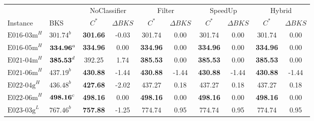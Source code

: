 \begin{table}[ht]
	\centering
	\scriptsize
	\renewcommand{\arraystretch}{1.02}
	\begin{tabular}{@{}llcccccccc@{}}
		\toprule
		                    &                             & \multicolumn{2}{c}{NoClassifier} & \multicolumn{2}{c}{Filter} & \multicolumn{2}{c}{SpeedUp} & \multicolumn{2}{c}{Hybrid}                                                                    \\ \cmidrule(lr){3-4}\cmidrule(lr){5-6}\cmidrule(lr){7-8}\cmidrule(lr){9-10}
		Instance            & BKS                         & $C^*$                            & $\Delta BKS$               & $C^*$                       & $\Delta BKS$               & $C^*$            & $\Delta BKS$ & $C^*$           & $\Delta BKS$ \\
		\midrule
		$\text{E016-03m}^H$ & $\text{301.74}^b$           & \textbf{301.66}                  & -0.03                      & 301.74                      & 0.00                       & 301.74           & 0.00         & 301.74          & 0.00         \\
		$\text{E016-05m}^H$ & $\text{\textbf{334.96}}^a$  & \textbf{334.96}                  & 0.00                       & \textbf{334.96}             & 0.00                       & \textbf{334.96}  & 0.00         & \textbf{334.96} & 0.00         \\
		$\text{E021-04m}^H$ & $\text{\textbf{385.53}}^d$  & 392.25                           & 1.74                       & \textbf{385.53}             & 0.00                       & \textbf{385.53}  & 0.00         & \textbf{385.53} & 0.00         \\
		$\text{E021-06m}^H$ & $\text{437.19}^b$           & \textbf{430.88}                  & -1.44                      & \textbf{430.88}             & -1.44                      & \textbf{430.88}  & -1.44        & \textbf{430.88} & -1.44        \\
		$\text{E022-04g}^H$ & $\text{436.48}^b$           & \textbf{427.68}                  & -2.02                      & 437.27                      & 0.18                       & 437.27           & 0.18         & 437.27          & 0.18         \\
		$\text{E022-06m}^H$ & $\text{\textbf{498.16}}^c$  & \textbf{498.16}                  & 0.00                       & \textbf{498.16}             & 0.00                       & \textbf{498.16}  & 0.00         & \textbf{498.16} & 0.00         \\
		$\text{E023-03g}^L$ & $\text{767.46}^b$           & \textbf{757.88}                  & -1.25                      & 774.74                      & 0.95                       & 774.74           & 0.95         & 774.74          & 0.95         \\

\end{tabular}
\end{table}
